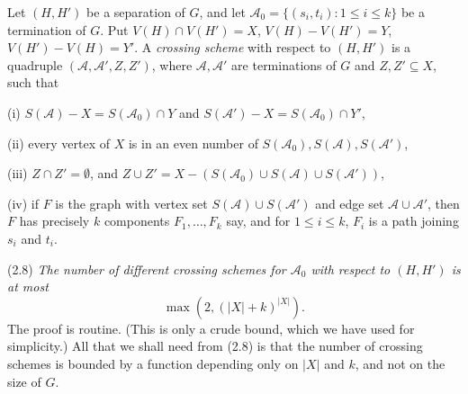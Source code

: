 Let $(H, H')$ be a separation of $G$, and let $\mathscr{A}_0 = \{(s_i, t_i) : 1 \le i \le k\}$ be a termination of $G$. Put $V(H) \cap V(H') = X$, $V(H) - V(H') = Y$, $V(H') - V(H) = Y'$. A \textit{crossing scheme} with respect to $(H, H')$ is a quadruple $(\mathscr{A}, \mathscr{A}', Z, Z')$, where $\mathscr{A}, \mathscr{A}'$ are terminations of $G$ and $Z, Z' \subseteq X$, such that

\hspace*{12pt}(i) $S(\mathscr{A}) - X = S(\mathscr{A}_0) \cap Y$ and $S(\mathscr{A}') - X = S(\mathscr{A}_0) \cap Y'$,

\hspace*{12pt}(ii) every vertex of $X$ is in an even number of $S(\mathscr{A}_0), S(\mathscr{A}), S(\mathscr{A}')$,

\hspace*{12pt}(iii) $Z \cap Z' = \emptyset$, and $Z \cup Z' = X - (S(\mathscr{A}_0) \cup S(\mathscr{A}) \cup S(\mathscr{A}'))$,

\hspace*{12pt}(iv) if $F$ is the graph with vertex set $S(\mathscr{A}) \cup S(\mathscr{A}')$ and edge set $\mathscr{A} \cup \mathscr{A}'$, then $F$ has precisely $k$ components $F_1, \dots, F_k$ say, and for $1 \le i \le k$, $F_i$ is a path joining $s_i$ and $t_i$.

\stmt
(2.8) \textit{The number of different crossing schemes for $\mathscr{A}_0$ with respect to $(H, H')$ is at most}
\begin{equation*}
\max(2, (|X| + k)^{|X|}).
\end{equation*}
The proof is routine. (This is only a crude bound, which we have used for simplicity.) All that we shall need from (2.8) is that the number of crossing schemes is bounded by a function depending only on $|X|$ and $k$, and not on the size of $G$.

